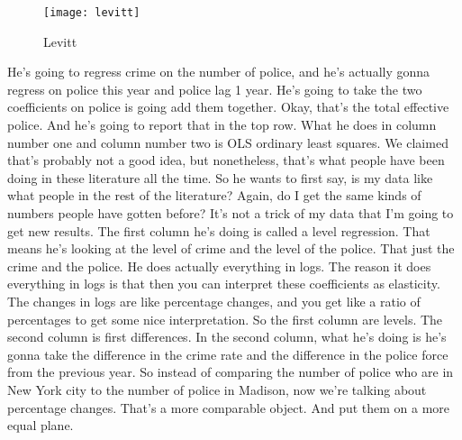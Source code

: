 \documentclass[11pt,a4paper]{amsart}
\theoremstyle{plain}
\theoremstyle{definition}
\begin{document}
 		  	\begin{figure}[hbt]
 		  {\centering \texttt{[image: levitt]}}
 		  \caption{Levitt}\label{F:levitt}
 		  \end{figure}
 		  He's going to regress crime on the number of police, and he's actually gonna regress on police this year and police lag 1 year. He's going to take the two coefficients on police is going add them together. Okay, that's the total effective police. And he's going to report that in the top row. What he does in column number one and column number two is OLS ordinary least squares. We claimed that's probably not a good idea, but nonetheless, that's what people have been doing in these literature all the time. So he wants to first say, is my data like what people in the rest of the literature? Again, do I get the same kinds of numbers people have gotten before? It's not a trick of my data that I'm going to get new results. The first column he's doing is called a level regression. That means he's looking at the level of crime and the level of the police. That just the crime and the police. He does actually everything in logs. The reason it does everything in logs is that then you can interpret these coefficients as elasticity. The changes in logs are like percentage changes, and you get like a ratio of percentages to get some nice interpretation. So the first column are levels. The second column is first differences. In the second column, what he's doing is he's gonna take the difference in the crime rate and the difference in the police force from the previous year.  So instead of comparing the number of police who are in New York city to the number of police in Madison, now we're talking about percentage changes. That's a more comparable object. And put them on a more equal plane. \par 
\end{document}
